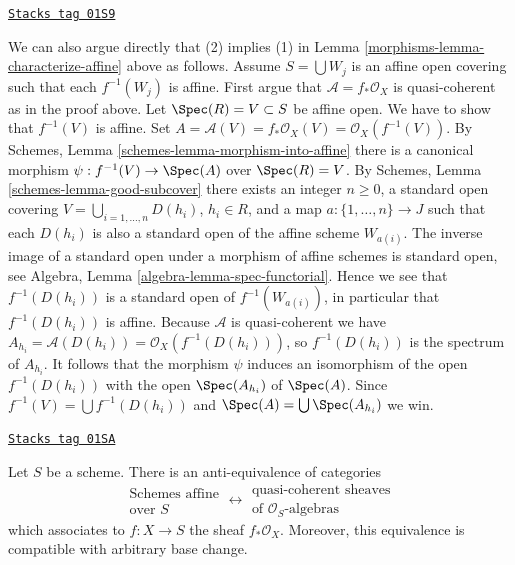 \begin{remark}
\label{morphisms-remark-direct-argument}
\href{https://stacks.math.columbia.edu/tag/01S9}{\texttt{Stacks tag 01S9}}

We can also argue directly that (2) implies (1) in
Lemma \ref{morphisms-lemma-characterize-affine} above as follows.
Assume $S = \bigcup W_j$ is an affine open covering
such that each $f^{-1}(W_j)$ is affine.
First argue that $\mathcal{A} = f_*\mathcal{O}_X$ is quasi-coherent
as in the proof above.
Let $\Spec(R) = V \subset S$ be affine open.
We have to show that $f^{-1}(V)$ is affine. Set
$A = \mathcal{A}(V) = f_*\mathcal{O}_X(V) = \mathcal{O}_X(f^{-1}(V))$.
By Schemes, Lemma \ref{schemes-lemma-morphism-into-affine} there is
a canonical morphism $\psi : f^{-1}(V) \to \Spec(A)$ over
$\Spec(R) = V$.
By Schemes, Lemma \ref{schemes-lemma-good-subcover} there exists
an integer $n \geq 0$, a standard open covering
$V = \bigcup_{i = 1, \ldots, n} D(h_i)$, $h_i \in R$, and a map
$a : \{1, \ldots, n\} \to J$ such that each $D(h_i)$ is also
a standard open of the affine scheme $W_{a(i)}$. The inverse image
of a standard open under a morphism of affine schemes is standard open, see
Algebra, Lemma \ref{algebra-lemma-spec-functorial}. Hence we see
that $f^{-1}(D(h_i))$ is a standard open of $f^{-1}(W_{a(i)})$,
in particular that $f^{-1}(D(h_i))$ is affine. Because $\mathcal{A}$
is quasi-coherent we have
$A_{h_i} = \mathcal{A}(D(h_i)) = \mathcal{O}_X(f^{-1}(D(h_i)))$,
so $f^{-1}(D(h_i))$ is the spectrum of $A_{h_i}$.
It follows that the morphism $\psi$ induces an isomorphism of the open
$f^{-1}(D(h_i))$ with the open $\Spec(A_{h_i})$ of
$\Spec(A)$. Since $f^{-1}(V) = \bigcup f^{-1}(D(h_i))$
and $\Spec(A) = \bigcup \Spec(A_{h_i})$ we win.
\end{remark}

\begin{lemma}
\label{morphisms-lemma-affine-equivalence-algebras}
\href{https://stacks.math.columbia.edu/tag/01SA}{\texttt{Stacks tag 01SA}}

Let $S$ be a scheme. There is an anti-equivalence of categories
$$
\begin{matrix}
\text{Schemes affine} \\
\text{over }S
\end{matrix}
\longleftrightarrow
\begin{matrix}
\text{quasi-coherent sheaves} \\
\text{of }\mathcal{O}_S\text{-algebras}
\end{matrix}
$$
which associates to $f : X \to S$ the sheaf $f_*\mathcal{O}_X$.
Moreover, this equivalence is compatible with arbitrary base change.
\end{lemma}

